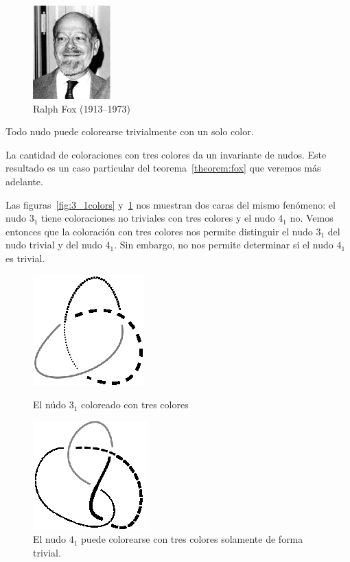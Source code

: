 \documentclass[graybox]{svmult}
\begin{document}
\begin{figure}[ht]
	\centering
    \includegraphics[width=30mm,height=36mm]{images/fox}
    \caption{Ralph Fox (1913--1973)}
\end{figure}



Todo nudo puede colorearse trivialmente con un solo color. 

La cantidad de coloraciones con tres colores da un invariante de nudos. Este
resultado es un caso particular del teorema~\ref{theorem:fox} que veremos más
adelante. 

\begin{example}
    \label{exa:3colors}
    Las figuras~\ref{fig:3_1colors} 
	y~\ref{fig:4_1colors} nos muestran dos caras del mismo fenómeno: el nudo
	$3_1$ tiene coloraciones no triviales con tres colores y el nudo $4_1$ no.
	Vemos entonces que la coloración con tres colores nos permite distinguir el
	nudo $3_1$ del nudo trivial y del nudo $4_1$. Sin embargo, no nos permite
	determinar si el nudo $4_1$ es trivial. 
	\begin{figure}[ht]
		\begin{minipage}{0.45\textwidth}
			\centering
			\includegraphics[scale=0.6]{images/3_1colors}
			\caption{El núdo $3_1$ coloreado con tres colores}
			\label{fig:3_1colors}
		\end{minipage}
		\begin{minipage}{0.45\textwidth}
			\centering
			\includegraphics[scale=0.6]{images/4_1colors}
			\caption{El nudo $4_1$ puede colorearse con tres colores solamente de forma trivial.}
			\label{fig:4_1colors}
		\end{minipage}
	\end{figure}
\end{example}
\end{document}

